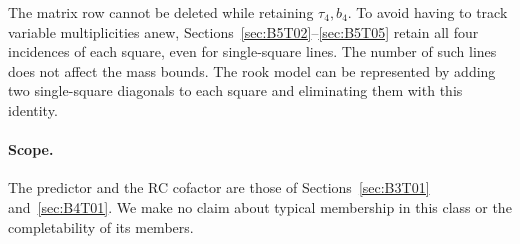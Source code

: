 The matrix row cannot be deleted while retaining $\tau_4,b_4$. To avoid having to track
variable multiplicities anew, Sections~\ref{sec:B5T02}--\ref{sec:B5T05} retain all four
incidences of each square, even for single-square lines. The number of such lines does
not affect the mass bounds. The rook model can be represented by adding two
single-square diagonals to each square and eliminating them with this identity.

\paragraph{Scope.}
The predictor and the RC cofactor are those of Sections~\ref{sec:B3T01} and~\ref{sec:B4T01}.
We make no claim about typical membership in this class or the completability of its members.
